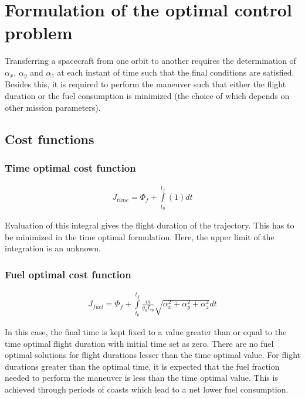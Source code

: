 \section{Formulation of the optimal control problem}
Transferring a spacecraft from one orbit to another requires the determination of $\alpha_x$, $\alpha_y$ and $\alpha_z$ at each instant of time such that the final conditions are satisfied. Besides this, it is required to perform the maneuver such that either the flight duration or the fuel consumption is minimized (the choice of which depends on other mission parameters).
\subsection{Cost functions}
\subsubsection{Time optimal cost function}
\begin{align}
	J_{time}=\Phi_f+\int\limits_{t_0}^{t_f}(1)dt
\end{align}

Evaluation of this integral gives the flight duration of the trajectory. This has to be minimized in the time optimal formulation. Here, the upper limit of the integration is an unknown.
\subsubsection{Fuel optimal cost function}
\begin{align}
	J_{fuel}=\Phi_f+\int\limits_{t_0}^{t_f}\frac{m}{g_0 I_{sp}}\sqrt{\alpha_x^2+\alpha_y^2+\alpha_z^2}dt
\end{align}

In this case, the final time is kept fixed to a value greater than or equal to the time optimal flight duration with initial time set as zero. There are no fuel optimal solutions for flight durations lesser than the time optimal value. For flight durations greater than the optimal time, it is expected that the fuel fraction needed to perform the maneuver is less than the time optimal value. This is achieved through periods of coasts which lead to a net lower fuel consumption. 
